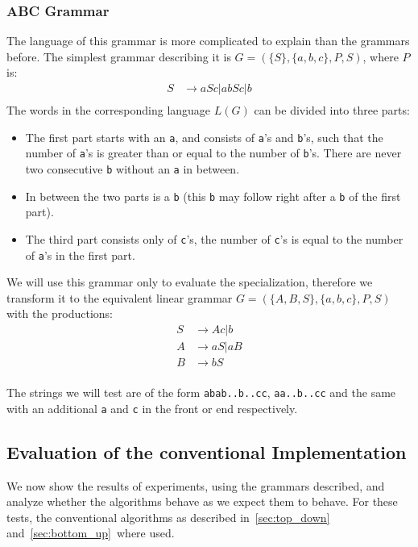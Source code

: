 \subsubsection{ABC Grammar}
The language of this grammar is more complicated to explain than the grammars before.
The simplest grammar describing it is $G=(\{S\}, \{a,b,c\},P,S)$, where $P$ is:
\begin{align*}
    S&\rightarrow aSc|abSc|b\\
\end{align*}
The words in the corresponding language $L(G)$ can be divided into three parts:
\begin{itemize}
    \item The first part starts with an \texttt{a}, and  consists of \texttt{a}'s and \texttt{b}'s, such that the number of \texttt{a}'s is greater than or equal to the number of \texttt{b}'s. There are never two consecutive \texttt{b} without an \texttt{a} in between.
    \item In between the two parts is a \texttt{b} (this \texttt{b} may follow right after a \texttt{b} of the first part).
    \item The third part consists only of \texttt{c}'s, the number of \texttt{c}'s is equal to the number of \texttt{a}'s in the first part.
\end{itemize}

We will use this grammar only to evaluate the specialization, therefore we transform it to the equivalent linear grammar $G=(\{A,B,S\}, \{a,b,c\}, P, S)$ with the productions:
\begin{align*}
    S&\rightarrow Ac|b\\
    A&\rightarrow aS|aB\\
    B&\rightarrow bS\\
\end{align*}

The strings we will test are of the form \texttt{abab..b..cc}, \texttt{aa..b..cc} and the same with an additional \texttt{a} and \texttt{c} in the front or end respectively.


\subsection{Evaluation of the conventional Implementation}
We now show the results of experiments, using the grammars described, and analyze whether the algorithms behave as we expect them to behave.
For these tests, the conventional algorithms as described in~\cref{sec:top_down} and~\ref{sec:bottom_up}~where used.

